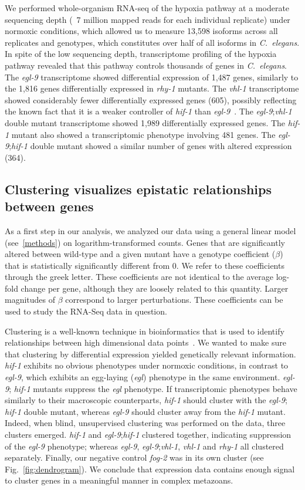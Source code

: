 \documentclass[9pt,twocolumn,twoside]{pnas-new}
\newcommand{\cel}{\emph{C.~elegans}}
\newcommand{\egl}{\emph{egl-9}}
\newcommand{\rhy}{\emph{rhy-1}}
\newcommand{\vhl}{\emph{vhl-1}}
\newcommand{\hif}{\emph{hif-1}}
\newcommand{\fog}{\emph{fog-2}}
\newcommand{\egln}{1,487}
\newcommand{\rhyn}{1,816}
\newcommand{\vhln}{605}
\newcommand{\eglvhln}{1,989}
\newcommand{\hifn}{481}
\newcommand{\eglhifn}{364}
\begin{document}
We performed whole-organism RNA-seq of the hypoxia pathway at a moderate
sequencing depth (~7 million mapped reads for each individual replicate) under
normoxic conditions, which allowed us to measure 13,598 isoforms across all
replicates and genotypes, which constitutes over half of all isoforms in \cel{}.
In spite of the low sequencing depth, transcriptome profiling of the hypoxia
pathway revealed that this pathway controls thousands of genes in \cel{}. The
\egl{} transcriptome showed differential expression of \egln{} genes, similarly to
the \rhyn{} genes differentially expressed in \rhy{} mutants. The \vhl{}
transcriptome showed considerably fewer differentially expressed genes (\vhln{}),
possibly reflecting the known fact that it is a weaker controller of \hif{} than
\egl{}~\cite{Shao2009}. The \egl{};\vhl{} double mutant transcriptome showed
\eglvhln{} differentially expressed genes. The \hif{} mutant also showed a
transcriptomic phenotype involving \hifn{} genes. The \egl{};\hif{} double mutant
showed a similar number of genes with altered expression (\eglhifn{}).

\subsection*{Clustering visualizes epistatic relationships between genes}
\label{sub:Clustering}

As a first step in our analysis, we analyzed our data using a general
linear model (see~\ref{methods}) on logarithm-transformed
counts. Genes that are significantly altered between wild-type and a given
mutant have a genotype coefficient ($\beta$) that is statistically significantly
different from 0. We refer to these coefficients through the greek letter. These
coefficients are not identical to the average log-fold change per gene, although
they are loosely related to this quantity. Larger magnitudes of $\beta$
correspond to larger perturbations. These coefficients can be used to study the
RNA-Seq data in question.

Clustering is a well-known technique in bioinformatics that is used to identify
relationships between high dimensional data points~\cite{Yeung2003}. We wanted
to make sure that clustering by differential expression yielded genetically
relevant information. \hif{} exhibits no obvious phenotypes under normoxic
conditions, in contrast to \egl{}, which exhibits an egg-laying (\emph{egl})
phenotype in the same environment. \egl{}; \hif{} mutants suppress the
\emph{egl} phenotype. If transcriptomic phenotypes behave similarly to their
macroscopic counterparts, \hif{} should cluster with the \egl{}; \hif{} double
mutant, whereas \egl{} should cluster away from the \hif{} mutant.
Indeed, when blind, unsupervised clustering was performed on the data, three
clusters emerged. \hif{} and \egl{};\hif{} clustered together, indicating
suppression of the \egl{} phenotype; whereas \egl{}, \egl{};\vhl{}, \vhl{} and
\rhy{} all clustered separately. Finally, our negative control \fog{} was in its
own cluster (see Fig.~\ref{fig:dendrogram}). We conclude that expression data
contains enough signal to cluster genes in a meaningful manner in complex
metazoans.
\end{document}
